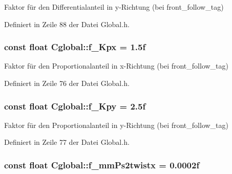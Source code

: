 Faktor für den Differentialanteil in y-\/Richtung (bei front\_\-follow\_\-tag) 



Definiert in Zeile 88 der Datei Global.h.

\hypertarget{class_cglobal_ae94b927d5fee8ac20eb04add78006959}{
\subsubsection[{f\_\-Kpx}]{\setlength{\rightskip}{0pt plus 5cm}const float {\bf Cglobal::f\_\-Kpx} = 1.5f}}
\label{class_cglobal_ae94b927d5fee8ac20eb04add78006959}


Faktor für den Proportionalanteil in x-\/Richtung (bei front\_\-follow\_\-tag) 



Definiert in Zeile 76 der Datei Global.h.

\hypertarget{class_cglobal_a06a9f451633a82b68760360037b53f64}{
\subsubsection[{f\_\-Kpy}]{\setlength{\rightskip}{0pt plus 5cm}const float {\bf Cglobal::f\_\-Kpy} = 2.5f}}
\label{class_cglobal_a06a9f451633a82b68760360037b53f64}


Faktor für den Proportionalanteil in y-\/Richtung (bei front\_\-follow\_\-tag) 



Definiert in Zeile 77 der Datei Global.h.

\hypertarget{class_cglobal_a4f723543ed33fd4a3130199a6a49f8de}{
\subsubsection[{f\_\-mmPs2twistx}]{\setlength{\rightskip}{0pt plus 5cm}const float {\bf Cglobal::f\_\-mmPs2twistx} = 0.0002f}}
\label{class_cglobal_a4f723543ed33fd4a3130199a6a49f8de}


